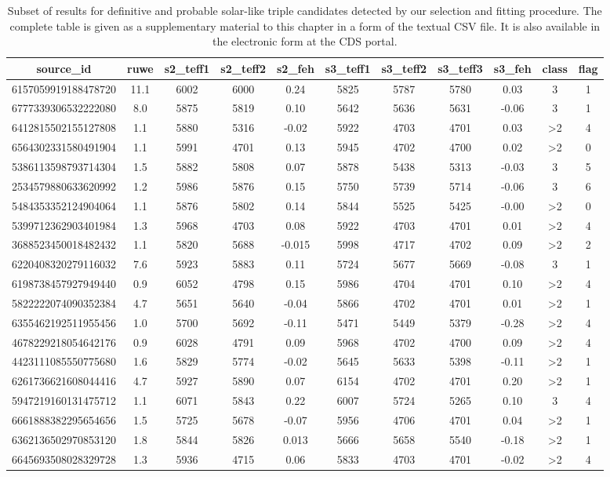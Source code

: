 \begin{table}
	\centering
	\caption{Subset of results for definitive and probable solar-like triple candidates detected by our selection and fitting procedure. The complete table is given as a supplementary material to this chapter in a form of the textual CSV file. It is also available in the electronic form at the CDS portal.}
	\label{tab:out_triple}
	\begin{tabular}{ccccccccccc}
		\hline
		source\_id & ruwe & s2\_teff1 & s2\_teff2 & s2\_feh & s3\_teff1 & s3\_teff2 & s3\_teff3 & s3\_feh & class & flag \\
		\hline
		6157059919188478720 & 11.1 & 6002 & 6000 & 0.24 & 5825 & 5787 & 5780 & 0.03 & 3 & 1 \\
		6777339306532222080 & 8.0 & 5875 & 5819 & 0.10 & 5642 & 5636 & 5631 & -0.06 & 3 & 1 \\
		6412815502155127808 & 1.1 & 5880 & 5316 & -0.02 & 5922 & 4703 & 4701 & 0.03 & >2 & 4 \\
		6564302331580491904 & 1.1 & 5991 & 4701 & 0.13 & 5945 & 4702 & 4700 & 0.02 & >2 & 0 \\
		5386113598793714304 & 1.5 & 5882 & 5808 & 0.07 & 5878 & 5438 & 5313 & -0.03 & 3 & 5 \\
		2534579880633620992 & 1.2 & 5986 & 5876 & 0.15 & 5750 & 5739 & 5714 & -0.06 & 3 & 6 \\
		5484353352124904064 & 1.1 & 5876 & 5802 & 0.14 & 5844 & 5525 & 5425 & -0.00 & >2 & 0 \\
		5399712362903401984 & 1.3 & 5968 & 4703 & 0.08 & 5922 & 4703 & 4701 & 0.01 & >2 & 4 \\
		3688523450018482432 & 1.1 & 5820 & 5688 & -0.015 & 5998 & 4717 & 4702 & 0.09 & >2 & 2 \\
		6220408320279116032 & 7.6 & 5923 & 5883 & 0.11 & 5724 & 5677 & 5669 & -0.08 & 3 & 1 \\
		6198738457927949440 & 0.9 & 6052 & 4798 & 0.15 & 5986 & 4704 & 4701 & 0.10 & >2 & 4 \\
		5822222074090352384 & 4.7 & 5651 & 5640 & -0.04 & 5866 & 4702 & 4701 & 0.01 & >2 & 1 \\
		6355462192511955456 & 1.0 & 5700 & 5692 & -0.11 & 5471 & 5449 & 5379 & -0.28 & >2 & 4 \\
		4678229218054642176 & 0.9 & 6028 & 4791 & 0.09 & 5968 & 4702 & 4700 & 0.09 & >2 & 4 \\
		4423111085550775680 & 1.6 & 5829 & 5774 & -0.02 & 5645 & 5633 & 5398 & -0.11 & >2 & 1 \\
		6261736621608044416 & 4.7 & 5927 & 5890 & 0.07 & 6154 & 4702 & 4701 & 0.20 & >2 & 1 \\
		5947219160131475712 & 1.1 & 6071 & 5843 & 0.22 & 6007 & 5724 & 5265 & 0.10 & 3 & 4 \\
		6661888382295654656 & 1.5 & 5725 & 5678 & -0.07 & 5956 & 4706 & 4701 & 0.04 & >2 & 1 \\
		6362136502970853120 & 1.8 & 5844 & 5826 & 0.013 & 5666 & 5658 & 5540 & -0.18 & >2 & 1 \\
		6645693508028329728 & 1.3 & 5936 & 4715 & 0.06 & 5833 & 4703 & 4701 & -0.02 & >2 & 4 \\
		\hline
	\end{tabular}
\end{table}
